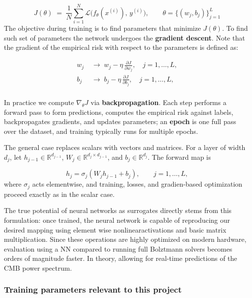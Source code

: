 \documentclass[11pt,a4paper]{article}
\numberwithin{equation}{section}
\begin{document}
$$
J(\theta) \;=\; \frac{1}{N}\sum_{i=1}^N \mathcal{L}\!\big(f_\theta(x^{(i)}),\,y^{(i)}\big),
  \qquad \theta=\{(w_j,b_j)\}_{j=1}^L
$$
The objective during training is to find parameters that minimize $J(\theta)$. To find such set of parameters the network undergoes the \textbf{gradient descent}. Note that the gradient of the empirical risk with respect to the parameters is defined as: 


$$
\begin{aligned}
  w_j &\;\rightarrow\; w_j - \eta\,\frac{\partial J}{\partial w_j}, \quad j=1, \dots,L, 
  \\
  b_j &\;\rightarrow\; b_j - \eta\,\frac{\partial J}{\partial b_j}, \quad j=1, \dots,L,
  \\
\end{aligned}
$$

In practice we compute $\nabla_\theta J$ via \textbf{backpropagation}. Each step performs a forward pass to form predictions, computes the empirical risk against labels, backpropagates gradients, and updates parameters; an \textbf{epoch} is one full pass over the dataset, and training typically runs for multiple epochs.

The general case replaces scalars with vectors and matrices. For a layer of width $d_j$, let $h_{j-1}\in\mathbb{R}^{d_{j-1}}$, $W_j\in\mathbb{R}^{d_j\times d_{j-1}}$, and $b_j\in\mathbb{R}^{d_j}$. The forward map is

\begin{equation}
  h_j = \sigma_j\!\left(W_j h_{j-1} + b_j\right), 
  \qquad j = 1, \dots , L ,
\end{equation}
where $\sigma_j$ acts elementwise, and training, losses, and gradien-based optimization proceed exactly as in the scalar case.

The true potential of neural networks as surrogates directly stems from this formulation: once trained, the neural network is capable of reproducing our desired mapping using element wise nonlinearactivations and basic matrix multiplication.
Since these operations are highly optimized on modern hardware, evaluation using a NN compared to running full Bolztmann solvers becomes orders of magnitude faster. In theory, allowing for real-time predictions of the CMB power spectrum.

\subsubsection{Training parameters relevant to this project}
\end{document}
